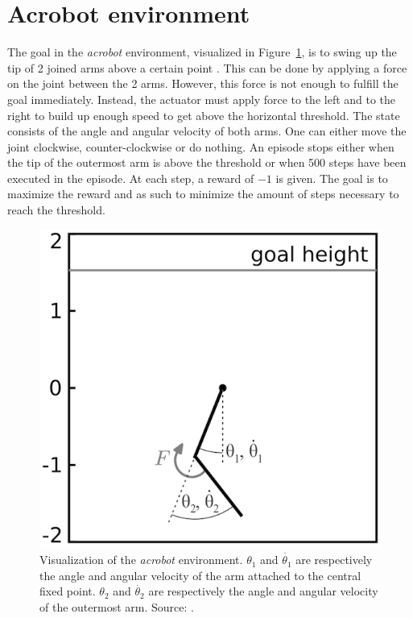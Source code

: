\section{Acrobot environment} %
\label{sub:acrobot_environment}
The goal in the \textit{acrobot} environment, visualized in Figure~\ref{fig:acrobot}, is to swing up the tip of 2 joined arms above a certain point \parencite{spong1995swing}.
This can be done by applying a force on the joint between the 2 arms.
However, this force is not enough to fulfill the goal immediately. Instead, the actuator must apply force to the left and to the right to build up enough speed to get above the horizontal threshold.
The state consists of the angle and angular velocity of both arms. One can either move the joint clockwise, counter-clockwise or do nothing.
An episode stops either when the tip of the outermost arm is above the threshold or when 500 steps have been executed in the episode.
At each step, a reward of $-1$ is given.
The goal is to maximize the reward and as such to minimize the amount of steps necessary to reach the threshold.
\begin{figure}[htb]
    \centering
    \includegraphics[width=.7\linewidth]{images/acrobot.png}
    \caption[Visualization of the \emph{acrobot} environment]{Visualization of the \emph{acrobot} environment. $\theta_1$ and $\dot{\theta_1}$ are respectively the angle and angular velocity of the arm attached to the central fixed point. $\theta_2$ and $\dot{\theta_2}$ are respectively the angle and angular velocity of the outermost arm. Source: \cite{fremaux2013reinforcement}.}
    \label{fig:acrobot}
\end{figure}

